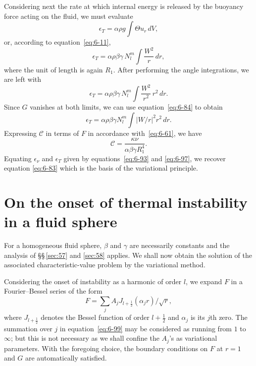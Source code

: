 Considering next the rate at which internal energy is released by the
buoyancy force acting on the fluid, we must evaluate
\begin{equation}\label{eq:6-94}
\epsilon_T = \alpha\rho g\!\int \Theta u_r\,dV,
\end{equation}
or, according to equation~\eqref{eq:6-11},
\begin{equation}\label{eq:6-95}
\epsilon_T = \alpha\rho\beta\gamma\,N_l^m\!\int \frac{W^2}{r}\,dr,
\end{equation}
where the unit of length is again $R_1$. After performing the angle integra\-tions, we are left with
\begin{equation}\label{eq:6-96}
\epsilon_T = \alpha\rho\beta\gamma\,N_l^m\!\int \frac{W^2}{r^2}\,r^2\,dr.
\end{equation}
Since $G$ vanishes at both limits, we can use equation~\eqref{eq:6-84} to obtain
\begin{equation}\label{eq:6-97}
\epsilon_T = \alpha\rho\beta\gamma N_l^m\!\int |W/r|^2 r^2\,dr.
\end{equation}
Expressing $\mathcal{C}$ in terms of $F$ in accordance with~\eqref{eq:6-61}, we have
\begin{equation}\label{eq:6-98}
\mathcal{C} = \frac{\kappa\nu}{\alpha\beta\gamma R_1^4}.
\end{equation}
Equating $\epsilon_\nu$ and $\epsilon_T$ given by equations~\eqref{eq:6-93} and \eqref{eq:6-97}, we recover equation
\eqref{eq:6-83} which is the basis of the variational principle.

\section{On the onset of thermal instability in a fluid sphere}\label{sec:59}
For a homogeneous fluid sphere, $\beta$ and $\gamma$ are necessarily constants and
the analysis of \S\S\,\ref{sec:57} and \ref{sec:58} applies. We shall now obtain the solution of
the associated characteristic-value problem by the variational method.

Considering the onset of instability as a harmonic of order $l$, we expand
$F$ in a Fourier--Bessel series of the form
\begin{equation}\label{eq:6-99}
F = \sum_{j} A_j J_{l+\frac{1}{2}}(\alpha_j r)/\sqrt{r},
\end{equation}
where $J_{l+\frac{1}{2}}$ denotes the Bessel function of order $l+\frac{1}{2}$ and $\alpha_j$ is its $j$th zero.
The summation over $j$ in equation~\eqref{eq:6-99} may be considered as running from
$1$ to $\infty$; but this is not necessary as we shall confine the $A_j$'s as variational
parameters. With the foregoing choice, the boundary conditions on $F$
at $r = 1$ and $G$ are automatically satisfied.

